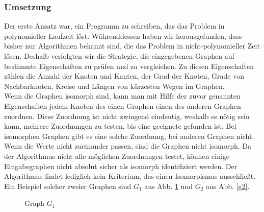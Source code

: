 \subsubsection{Umsetzung} %
Der erste Ansatz war, ein Programm zu schreiben, das das Problem in polynomieller Laufzeit l\"ost.
W\"ahrenddessen haben wir herausgefunden, dass bisher nur Algorithmen bekannt sind, die das Problem in nicht-polynomieller Zeit l\"osen. Deshalb verfolgten wir die Strategie, die eingegebenen Graphen auf bestimmte Eigenschaften zu pr\"ufen und zu vergleichen. Zu diesen Eigenschaften z\"ahlen die Anzahl der Knoten und Kanten, der Grad der Knoten, Grade von Nachbarknoten, Kreise und L\"angen von k\"urzesten Wegen im Graphen. \\
Wenn die Graphen isomorph sind, kann man mit Hilfe der zuvor genannten Eigenschaften jedem Knoten des einen Graphen einen des anderen Graphen zuordnen. Diese Zuordnung ist nicht zwingend eindeutig, weshalb es nötig sein kann, mehrere Zuordnungen zu testen, bis eine geeignete gefunden ist. Bei isomorphen Graphen gibt es eine solche Zuordnung, bei anderen Graphen nicht. Wenn die Werte nicht zueinander passen, sind die Graphen nicht isomorph. Da der Algorithmus nicht alle möglichen Zuordnungen testet, können einige Eingabegraphen nicht absolut sicher als isomorph identifiziert werden. Der Algorithmus findet lediglich kein Kriterium, das einen Isomorpismus ausschließt. Ein Beispiel solcher zweier Graphen sind $G_1$ aus Abb. \ref{g1} und $G_2$ aus Abb. \ref{g2}.\\
\begin{figure}
\centering
{}
\caption{Graph $G_{1}$}
\label{g1}
\end{figure}\\
